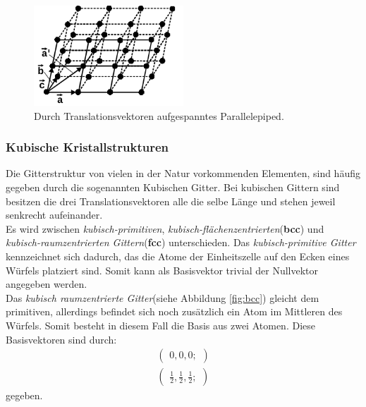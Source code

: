\begin{figure}[hhh]
\centering
\includegraphics[width=0.5\textwidth]{abbildungen/epiped.png}
\caption{Durch Translationsvektoren aufgespanntes Parallelepiped.\cite{sample}}
\label{fig:abb2}
\end{figure}

\subsubsection{Kubische Kristallstrukturen}
\label{subsubsec:kubische_gitter}

Die Gitterstruktur von vielen in der Natur vorkommenden Elementen,
sind häufig gegeben durch die sogenannten Kubischen Gitter.
Bei kubischen Gittern sind besitzen die drei Translationsvektoren
alle die selbe Länge und stehen jeweil senkrecht aufeinander.\\
Es wird zwischen \textit{kubisch-primitiven},
\textit{kubisch-flächenzentrierten}(\textbf{bcc}) und \\
\textit{kubisch-raumzentrierten Gittern}(\textbf{fcc}) unterschieden.
Das \textit{kubisch-primitive Gitter}
kennzeichnet sich dadurch,
das die Atome der Einheitszelle auf den Ecken
eines Würfels platziert sind. Somit kann als Basisvektor trivial
der Nullvektor angegeben werden.\\
Das \textit{kubisch raumzentrierte Gitter}(siehe Abbildung \ref{fig:bcc})
gleicht dem primitiven, allerdings befindet sich noch
zusätzlich ein Atom im Mittleren des Würfels.
Somit besteht in diesem Fall die Basis aus zwei Atomen.
Diese Basisvektoren sind durch:
\begin{align}
\label{eqn:2*}
\begin{pmatrix}
0, 0, 0;
\end{pmatrix}\\
\begin{pmatrix}
\frac{1}{2}, \frac{1}{2}, \frac{1}{2};
\end{pmatrix}
\end{align}
gegeben.\\

